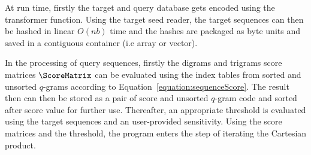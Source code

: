 At run time, firstly the target and query database gets encoded using the transformer function. Using the target seed reader, the target sequences can then be hashed in linear \(O(nb)\) time and the hashes are packaged as byte units and saved in a contiguous container (i.e array or vector).

In the processing of query sequences, firstly the digrams and trigrams score matrices \(\ScoreMatrix\) can be evaluated using the index tables from sorted and unsorted \(q\)-grams according to Equation~\ref{equation:sequenceScore}. The result then can then be stored as a pair of score and unsorted \(q\)-gram code and sorted after score value for further use. Thereafter, an appropriate threshold is evaluated using the target sequences and an user-provided sensitivity. Using the score matrices and the threshold, the program enters the step of iterating the Cartesian product.

